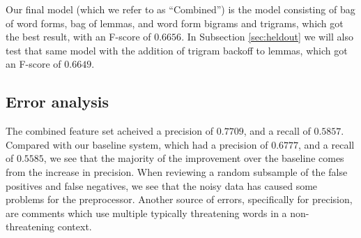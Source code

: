 \documentclass[11pt,letterpaper]{article}
\begin{document}
Our final model (which we refer to as ``Combined'') is the model consisting of bag of word forms, bag of lemmas, and word form bigrams and trigrams, which got the best result, with an F-score of $0.6656$. In Subsection \ref{sec:heldout} we will also test that same model with the addition of trigram backoff to lemmas, which got an F-score of $0.6649$.






\subsection{Error analysis}

The combined feature set acheived a precision of $0.7709$, and a recall of $0.5857$. Compared with our baseline system, which had a precision of $0.6777$, and a recall of $0.5585$, we see that the majority of the improvement over the baseline comes from the increase in precision. When reviewing a random subsample of the false positives and false negatives, we see that the noisy data has caused some problems for the preprocessor. Another source of errors, specifically for precision, are comments which use multiple typically threatening words in a non-threatening context.


      
      
      

\end{document}
